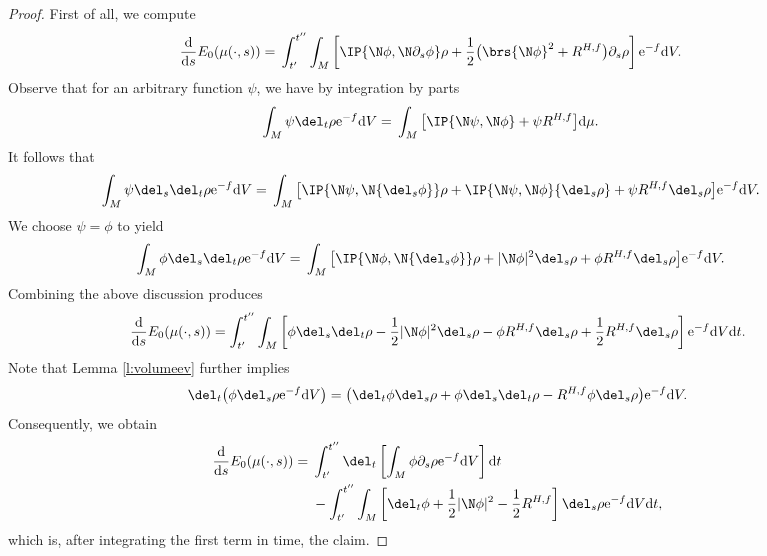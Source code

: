 \begin{proof}
	First of all, we compute
	\begin{align*}
	\frac{{\rm d}}{{\rm d}s}E_0(\mu(\cdot,s)) ={}&\int_{t'}^{t''} \int_M \left[ \IP{\N \phi, \N \partial_s \phi} \rho + \frac{1}{2}\big( \brs{\N \phi}^2 + R^{H,f} \big) \partial_s \rho \right] {\rm e}^{-f} {\rm d}V.
	\end{align*}
	Observe that for an arbitrary function $\psi$, we have by integration by parts
	\begin{align*}
	\int_M \psi {\del_t \rho} {\rm e}^{-f} {\rm d}V
	={}&\int_M \big[ \IP{\N \psi, \N \phi} + \psi R^{H,f} \big] {\rm d}\mu.
	\end{align*}
	It follows that
	\begin{align*}
	\int_M \psi {\del_s\del_t \rho} {\rm e}^{-f} {\rm d}V ={}&\int_M \big[ \IP{\N \psi, \N {\del_s \phi}} \rho + \IP{\N \psi, \N \phi} {\del_s \rho} + \psi R^{H,f}\del_s\rho \big] {\rm e}^{-f} {\rm d}V.
	\end{align*}
	We choose $\psi = \phi$ to yield
	\begin{align*}
	\int_M \phi {\del_s\del_t \rho} {\rm e}^{-f} {\rm d}V ={}&\int_M \big[ \IP{\N \phi, \N {\del_s \phi}} \rho + |\N \phi|^2 {\del_s \rho} + \phi R^{H,f}\del_s\rho \big] {\rm e}^{-f} {\rm d}V.
	\end{align*}
	Combining the above discussion produces
	\begin{align*}
	\frac{{\rm d}}{{\rm d}s}E_0(\mu(\cdot,s))=\int_{t'}^{t''}\int_M\left[ \phi \del_s\del_t\rho -\frac12|\N\phi|^2 \del_s\rho-\phi R^{H,f} \del_s\rho+\frac12 R^{H,f} \del_s\rho\right] {\rm e}^{-f} {\rm d}V{\rm d}t.
	\end{align*}
	Note that Lemma \ref{l:volumeev} further implies
	\begin{align*}
	\del_t\big(\phi \del_s\rho {\rm e}^{-f} {\rm d}V\big)=\big(\del_t\phi \del_s\rho +\phi \del_s\del_t\rho - R^{H,f}\phi \del_s\rho \big){\rm e}^{-f} {\rm d}V.
	\end{align*}
	Consequently, we obtain
	\begin{align*}
	\frac{{\rm d}}{{\rm d}s} E_0(\mu(\cdot,s))={}& \int_{t'}^{t''} \del_t \left[ \int_M \phi\partial_s\rho {\rm e}^{-f} {\rm d}V \right] {\rm d}t \\
 &-\int_{t'}^{t''}\int_M\left[\del_t\phi+\frac12|\N\phi|^2-\frac12 R^{H,f}\right]\del_s\rho {\rm e}^{-f} {\rm d}V{\rm d}t,
	\end{align*}
	which is, after integrating the first term in time, the claim.
\end{proof}

